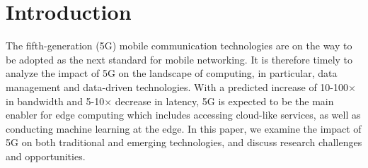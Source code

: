 \documentclass[11pt]{article}
\begin{document}

\vspace{-3mm}
\section{Introduction}
\vspace{-1mm}

The fifth-generation (5G) mobile communication technologies are on the way to be
adopted as the next standard for mobile networking. It is therefore timely to
analyze the impact of 5G on the landscape of computing, in particular, data
management and data-driven technologies. With a predicted increase of
10-100$\times$ in bandwidth and 5-10$\times$ decrease in latency, 5G is expected
to be the main enabler for edge computing which includes accessing cloud-like
services, as well as conducting machine learning at the edge. In this paper, we
examine the impact of 5G on both traditional and emerging technologies, and
discuss research challenges and opportunities.
\end{document}
